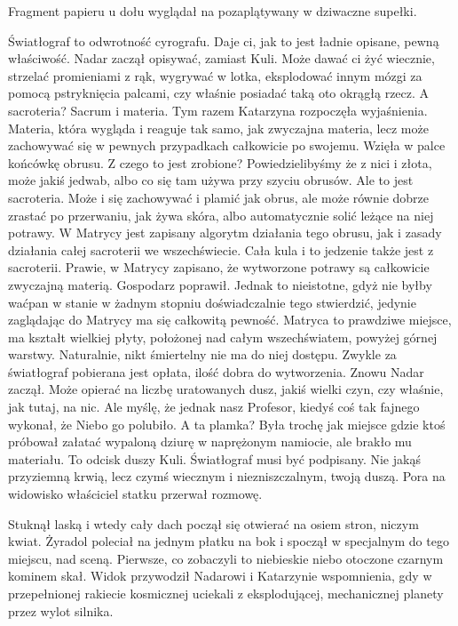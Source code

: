 Fragment papieru u dołu wyglądał na pozaplątywany w dziwaczne supełki.

\begin{dialogue}
\ds{} Światłograf to odwrotność cyrografu. Daje ci, jak to jest ładnie opisane, pewną właściwość. \dm{} Nadar zaczął opisywać, zamiast Kuli. \dm{}
Może dawać ci żyć wiecznie, strzelać promieniami z rąk, wygrywać w lotka, eksplodować innym mózgi za pomocą pstryknięcia palcami, czy właśnie posiadać taką oto okrągłą rzecz.
\ds{} A sacroteria? 
\ds{} Sacrum i materia. \dm{} Tym razem Katarzyna rozpoczęła wyjaśnienia. \dm{} 
Materia, która wygląda i reaguje tak samo, jak zwyczajna materia, lecz może zachowywać się w pewnych przypadkach całkowicie po swojemu. \dm{} 
Wzięła w palce końcówkę obrusu. \dm{} Z czego to jest zrobione? 
Powiedzielibyśmy że z nici i złota, może jakiś jedwab, albo co się tam używa przy szyciu obrusów.
Ale to jest sacroteria. Może i się zachowywać i plamić jak obrus, ale może równie dobrze zrastać po przerwaniu, jak żywa skóra, albo automatycznie solić leżące na niej potrawy.
W Matrycy jest zapisany algorytm działania tego obrusu, jak i zasady działania całej sacroterii we wszechświecie. 
Cała kula i to jedzenie także jest z sacroterii.
\ds{} Prawie, w Matrycy zapisano, że wytworzone potrawy są całkowicie zwyczajną materią. \dm{} Gospodarz poprawił. \dm{}
Jednak to nieistotne, gdyż nie byłby waćpan w stanie w żadnym stopniu doświadczalnie tego stwierdzić, jedynie zaglądając do Matrycy ma się całkowitą pewność. 
Matryca to prawdziwe miejsce, ma kształt wielkiej płyty, położonej nad całym wszechświatem, powyżej górnej warstwy. Naturalnie, nikt śmiertelny nie ma do niej dostępu.
\ds{} Zwykle za światłograf pobierana jest opłata, ilość dobra do wytworzenia. \dm{} Znowu Nadar zaczął. \dm{} 
Może opierać na liczbę uratowanych dusz, jakiś wielki czyn, czy właśnie, jak tutaj, na nic. 
Ale myślę, że jednak nasz Profesor, kiedyś coś tak fajnego wykonał, że Niebo go polubiło.
\ds{} A ta plamka? \dm{} Była trochę jak miejsce gdzie ktoś próbował załatać wypaloną dziurę w naprężonym namiocie, ale brakło mu materiału.
\ds{} To odcisk duszy Kuli. Światłograf musi być podpisany. Nie jakąś przyziemną krwią, lecz czymś wiecznym i niezniszczalnym, twoją duszą.
\ds{} Pora na widowisko \dm{} właściciel statku przerwał rozmowę.
\end{dialogue}

Stuknął laską i wtedy cały dach począł się otwierać na osiem stron, niczym kwiat. 
Żyradol poleciał na jednym płatku na bok i spoczął w specjalnym do tego miejscu, nad sceną.
Pierwsze, co zobaczyli to niebieskie niebo otoczone czarnym kominem skał.
Widok przywodził Nadarowi i Katarzynie wspomnienia, gdy w przepełnionej rakiecie kosmicznej uciekali z eksplodującej, mechanicznej planety przez wylot silnika.

